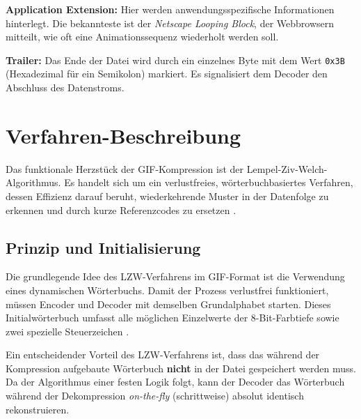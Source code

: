\documentclass[a4paper,11pt]{scrartcl}
\theoremstyle{definition} %
\begin{document}
\bigskip

\noindent \textbf{Application Extension:}
Hier werden anwendungsspezifische Informationen hinterlegt. Die bekannteste ist der \textit{Netscape Looping Block}, der Webbrowsern mitteilt, wie oft eine Animationssequenz wiederholt werden soll.

\bigskip

\noindent \textbf{Trailer:}
Das Ende der Datei wird durch ein einzelnes Byte mit dem Wert \texttt{0x3B} (Hexadezimal für ein Semikolon) markiert. Es signalisiert dem Decoder den Abschluss des Datenstroms.

\section{Verfahren-Beschreibung}\label{kap:algo}

Das funktionale Herzstück der GIF-Kompression ist der Lempel-Ziv-Welch-Algorithmus. Es handelt sich um ein verlustfreies, wörterbuchbasiertes Verfahren, dessen Effizienz darauf beruht, wiederkehrende Muster in der Datenfolge zu erkennen und durch kurze Referenzcodes zu ersetzen \parencite{salomon2007}.

\subsection{Prinzip und Initialisierung}
Die grundlegende Idee des LZW-Verfahrens im GIF-Format ist die Verwendung eines dynamischen Wörterbuchs. Damit der Prozess verlustfrei funktioniert, müssen Encoder und Decoder mit demselben Grundalphabet starten. Dieses Initialwörterbuch umfasst alle möglichen Einzelwerte der 8-Bit-Farbtiefe sowie zwei spezielle Steuerzeichen \parencite{BlackstockLZW}.

Ein entscheidender Vorteil des LZW-Verfahrens ist, dass das während der Kompression aufgebaute Wörterbuch \textbf{nicht} in der Datei gespeichert werden muss. Da der Algorithmus einer festen Logik folgt, kann der Decoder das Wörterbuch während der Dekompression \textit{on-the-fly} (schrittweise) absolut identisch rekonstruieren.
\end{document}
